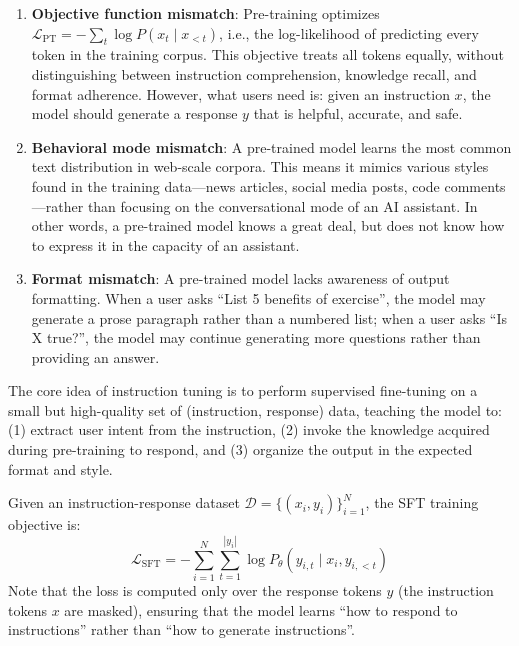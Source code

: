 \begin{problembox}
\begin{enumerate}[leftmargin=1.5em]
  \item \textbf{Objective function mismatch}:
    Pre-training optimizes $\mathcal{L}_{\text{PT}} = -\sum_t \log P(x_t \mid x_{<t})$,
    i.e., the log-likelihood of predicting every token in the training corpus.
    This objective treats all tokens equally, without distinguishing between instruction comprehension, knowledge recall, and format adherence.
    However, what users need is: given an instruction $x$, the model should generate a response $y$ that is helpful, accurate, and safe.

  \item \textbf{Behavioral mode mismatch}:
    A pre-trained model learns the most common text distribution in web-scale corpora.
    This means it mimics various styles found in the training data---news articles, social media posts, code comments---rather
    than focusing on the conversational mode of an AI assistant.
    In other words, a pre-trained model knows a great deal, but does not know how to express it in the capacity of an assistant.

  \item \textbf{Format mismatch}:
    A pre-trained model lacks awareness of output formatting.
    When a user asks ``List 5 benefits of exercise'', the model may generate a prose paragraph rather than a numbered list;
    when a user asks ``Is X true?'', the model may continue generating more questions rather than providing an answer.
\end{enumerate}
\end{problembox}

\noindent
The core idea of instruction tuning is to perform supervised fine-tuning on a small but high-quality set of (instruction, response) data,
teaching the model to:
(1) extract user intent from the instruction,
(2) invoke the knowledge acquired during pre-training to respond, and
(3) organize the output in the expected format and style.

\begin{solutionbox}
Given an instruction-response dataset $\mathcal{D} = \{(x_i, y_i)\}_{i=1}^N$,
the SFT training objective is:
\[
  \mathcal{L}_{\text{SFT}} = -\sum_{i=1}^{N} \sum_{t=1}^{|y_i|}
    \log P_\theta(y_{i,t} \mid x_i, y_{i,<t})
\]
Note that the loss is computed only over the response tokens $y$ (the instruction tokens $x$ are masked),
ensuring that the model learns ``how to respond to instructions'' rather than ``how to generate instructions''.
\end{solutionbox}


